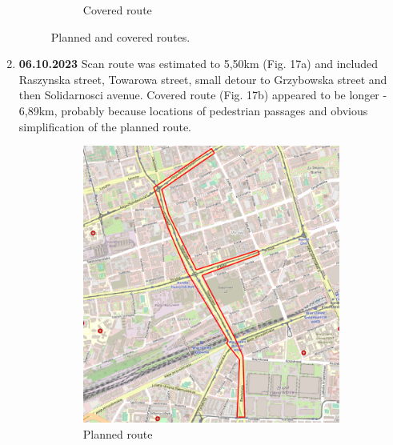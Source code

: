 \documentclass[a4paper,12pt]{article}
\begin{document}
\begin{enumerate}
\begin{figure}[H]
\begin{subfigure}{.85\textwidth}
			\caption{Covered route}
			\label{fig:b15}
		\end{subfigure}
		\caption{Planned and covered routes.}
		\label{fig:fig15}
	\end{figure} 
	\pagebreak
	
	\item \textbf{06.10.2023} Scan route was estimated to 5,50km (Fig. 17a) and included Raszynska street, Towarowa street, small detour to Grzybowska street and then Solidarnosci avenue. Covered route (Fig. 17b) appeared to be longer - 6,89km, probably because locations of pedestrian passages and obvious simplification of the planned route. 
	\begin{figure}[H]
		\centering
		\begin{subfigure}{.63\textwidth}
			\centering
			\includegraphics[width=1\linewidth]{route_p16}
			\caption{Planned route}
			\label{fig:a16}
		\end{subfigure}%
		\linebreak
		\begin{subfigure}{.63\textwidth}
			\centering

\end{subfigure}
\end{figure}
\end{enumerate}
\end{document}
